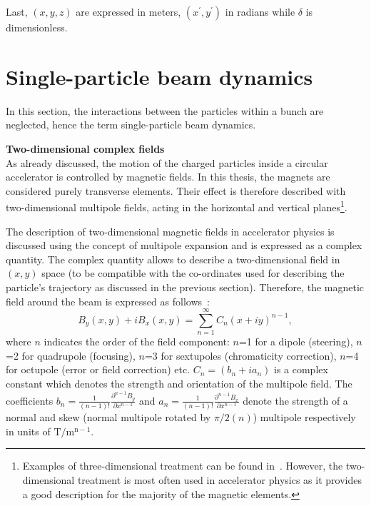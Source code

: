 Last, $(x, y, z)$ are expressed in meters, $(x^\prime, y^\prime)$ in radians while $\delta$ is dimensionless.

\section{Single-particle beam dynamics}
In this section, the interactions between the particles within a bunch are neglected, hence the term single-particle beam dynamics. 

\textbf{Two-dimensional complex fields}\\
As already discussed, the motion of the charged particles inside a circular accelerator is controlled by magnetic fields. In this thesis, the magnets are considered purely transverse elements. Their effect is therefore described with two-dimensional multipole fields, acting in the horizontal and vertical planes\footnote{Examples of three-dimensional treatment can be found in~\cite{wolski2014, Beth:889480}. However, the two-dimensional treatment is most often used in accelerator physics as it provides a good description for the majority of the magnetic elements.}. %

The description of two-dimensional magnetic fields in accelerator physics is discussed using the concept of multipole expansion and is expressed as a complex quantity. The complex quantity allows to describe a two-dimensional field in $(x,y)$ space (to be compatible with the co-ordinates used for describing the particle's trajectory as discussed in the previous section). Therefore, the magnetic field around the beam is expressed as follows~\cite{wolski2014}: 
\begin{equation}\label{eq:mult_expansion} %
    B_y(x,y) + i B_x(x,y) = \sum_{n=1}^{\infty} C_n (x+i y)^{n-1},
\end{equation} %
where $n$ indicates the order of the field component: $n$=1 for a dipole (steering), $n$=2 for quadrupole (focusing), $n$=3 for sextupoles (chromaticity correction), $n$=4 for octupole (error or field correction) etc. $C_n=(b_n +i a_n)$ is a complex constant which denotes the strength and orientation of the multipole field. The coefficients $b_n=\frac{1}{(n-1)!} \frac{\partial^{n-1}B_y}{\partial x^{n-1}}$ and $a_n=\frac{1}{(n-1)!} \frac{\partial^{n-1}B_x}{\partial x^{n-1}}$ denote the strength of a normal and skew (normal multipole rotated by $\pi/2(n)$) multipole respectively in units of $\mathrm{T/m^{n-1}}$.

